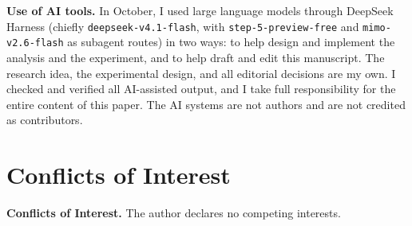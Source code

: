 \documentclass[10pt]{article}
\begin{document}
\textbf{Use of AI tools.} In October, I used large language models through DeepSeek Harness (chiefly \texttt{deepseek-v4.1-flash}, with \texttt{step-5-preview-free} and \texttt{mimo-v2.6-flash} as subagent routes) in two ways: to help design and implement the analysis and the experiment, and to help draft and edit this manuscript. The research idea, the experimental design, and all editorial decisions are my own. I checked and verified all AI-assisted output, and I take full responsibility for the entire content of this paper. The AI systems are not authors and are not credited as contributors.

\section*{Conflicts of Interest}

\textbf{Conflicts of Interest.} The author declares no competing interests.
\end{document}
